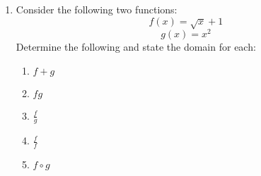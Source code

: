 \documentclass[letterpaper,12pt,fleqn]{article}
\begin{document}
\begin{enumerate}
\item Consider the following two functions:
  \[f(x)=\sqrt{x}+1\]
  \[g(x)=x^2\]
  Determine the following and state the domain for each:
  \begin{enumerate}
  \item $f+g$
  \item $fg$
  \item $\frac{f}{g}$
  \item $\frac{f}{f}$
  \item $f\circ g$
  \end{enumerate}
  
\end{enumerate}
\end{document}
